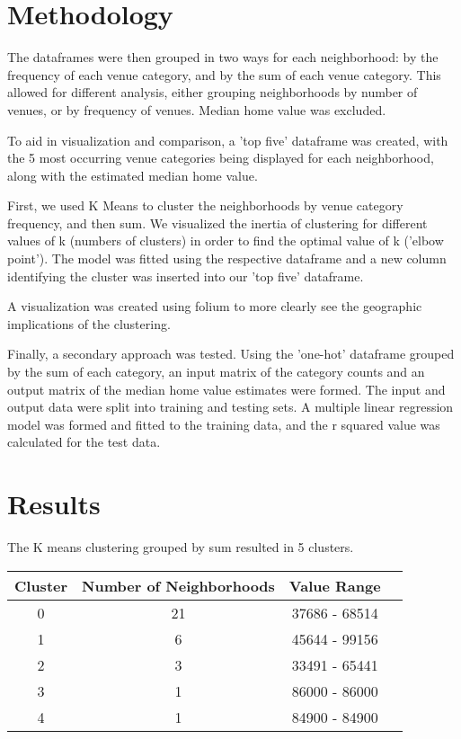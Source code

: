 \documentclass[twoside,14pt]{report}
\begin{document}
\chapter*{Methodology}

The dataframes were then grouped in two ways for each neighborhood: by the frequency of each venue category, and by the sum of each venue category.  This allowed for different analysis, either grouping neighborhoods by number of venues, or by frequency of venues.  Median home value was excluded.

To aid in visualization and comparison, a 'top five' dataframe was created, with the 5 most occurring venue categories being displayed for each neighborhood, along with the estimated median home value.

First, we used K Means to cluster the neighborhoods by venue category frequency, and then sum.  We visualized the inertia of clustering for different values of k (numbers of clusters) in order to find the optimal value of k ('elbow point').  The model was fitted using the respective dataframe and a new column identifying the cluster was inserted into our 'top five' dataframe.  

A visualization was created using folium to more clearly see the geographic implications of the clustering.

Finally, a secondary approach was tested.  Using the 'one-hot' dataframe grouped by the sum of each category, an input matrix of the category counts and an output matrix of the median home value estimates were formed.  The input and output data were split into training and testing sets.  A multiple linear regression model was formed and fitted to the training data, and the r squared value was calculated for the test data.  


\chapter*{Results}

The K means clustering grouped by sum resulted in 5 clusters.

\begin{tabular}{c|c|c|c}
Cluster & Number of Neighborhoods & Value Range\\ \hline
0 & 21 & 37686 - 68514\\
1 & 6 & 45644 - 99156 \\
2 & 3 & 33491 - 65441\\
3 & 1 & 86000 - 86000 \\
4&1&84900 - 84900\\
\end{tabular}
\end{document}
